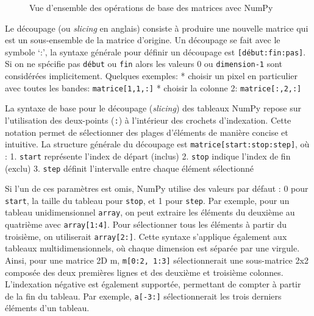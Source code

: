 \documentclass[
  11pt,
  letterpaper,
  open=any,
  twoside=false,
  french]{scrbook}
\begin{document}
\begin{figure}


\caption{\label{fig-naturenumpy2}Vue d'ensemble des opérations de base
des matrices avec NumPy}

\end{figure}%

Le découpage (ou \emph{slicing} en anglais) consiste à produire une
nouvelle matrice qui est un sous-ensemble de la matrice d'origine. Un
découpage se fait avec le symbole `:', la syntaxe générale pour définir
un découpage est \texttt{{[}début:fin:pas{]}}. Si on ne spécifie pas
\texttt{début} ou \texttt{fin} alors les valeurs 0 ou
\texttt{dimension-1} sont considérées implicitement. Quelques exemples:
* choisir un pixel en particulier avec toutes les bandes:
\texttt{matrice{[}1,1,:{]}} * choisir la colonne 2:
\texttt{matrice{[}:,2,:{]}}

La syntaxe de base pour le découpage (\emph{slicing}) des tableaux NumPy
repose sur l'utilisation des deux-points (\texttt{:}) à l'intérieur des
crochets d'indexation. Cette notation permet de sélectionner des plages
d'éléments de manière concise et intuitive. La structure générale du
découpage est \texttt{matrice{[}start:stop:step{]}}, où : 1.
\texttt{start} représente l'index de départ (inclus) 2. \texttt{stop}
indique l'index de fin (exclu) 3. \texttt{step} définit l'intervalle
entre chaque élément sélectionné

Si l'un de ces paramètres est omis, NumPy utilise des valeurs par défaut
: 0 pour \texttt{start}, la taille du tableau pour \texttt{stop}, et 1
pour \texttt{step}. Par exemple, pour un tableau unidimensionnel
\texttt{array}, on peut extraire les éléments du deuxième au quatrième
avec \texttt{array{[}1:4{]}}. Pour sélectionner tous les éléments à
partir du troisième, on utiliserait \texttt{array{[}2:{]}}. Cette
syntaxe s'applique également aux tableaux multidimensionnels, où chaque
dimension est séparée par une virgule. Ainsi, pour une matrice 2D m,
\texttt{m{[}0:2,\ 1:3{]}} sélectionnerait une sous-matrice 2x2 composée
des deux premières lignes et des deuxième et troisième colonnes.
L'indexation négative est également supportée, permettant de compter à
partir de la fin du tableau. Par exemple, \texttt{a{[}-3:{]}}
sélectionnerait les trois derniers éléments d'un tableau.
\end{document}

